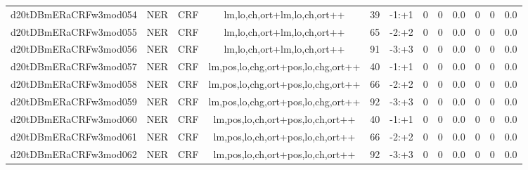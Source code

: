 \documentclass[a4paper]{article}
\begin{document}
\begin{landscape}
\begin{center}
\begin{tabular}{ |c|c|c|c|c|c|c|c|c|c|c|c|}
 
 	
 	\small{ d20tDBmERaCRFw3mod054 } & \small{ NER} & \small{  CRF }  & lm,lo,ch,ort+lm,lo,ch,ort++  &  39 &  \small{  -1:+1 }  &  0 & 0 & 0.0  &  0 & 0 & 0.0 \\
 	

 
 	
 	\small{ d20tDBmERaCRFw3mod055 } & \small{ NER} & \small{  CRF }  & lm,lo,ch,ort+lm,lo,ch,ort++  &  65 &  \small{  -2:+2 }  &  0 & 0 & 0.0  &  0 & 0 & 0.0 \\
 	

 
 	
 	\small{ d20tDBmERaCRFw3mod056 } & \small{ NER} & \small{  CRF }  & lm,lo,ch,ort+lm,lo,ch,ort++  &  91 &  \small{  -3:+3 }  &  0 & 0 & 0.0  &  0 & 0 & 0.0 \\
 	

 
 	
 	\small{ d20tDBmERaCRFw3mod057 } & \small{ NER} & \small{  CRF }  & lm,pos,lo,chg,ort+pos,lo,chg,ort++  &  40 &  \small{  -1:+1 }  &  0 & 0 & 0.0  &  0 & 0 & 0.0 \\
 	

 
 	
 	\small{ d20tDBmERaCRFw3mod058 } & \small{ NER} & \small{  CRF }  & lm,pos,lo,chg,ort+pos,lo,chg,ort++  &  66 &  \small{  -2:+2 }  &  0 & 0 & 0.0  &  0 & 0 & 0.0 \\
 	

 
 	
 	\small{ d20tDBmERaCRFw3mod059 } & \small{ NER} & \small{  CRF }  & lm,pos,lo,chg,ort+pos,lo,chg,ort++  &  92 &  \small{  -3:+3 }  &  0 & 0 & 0.0  &  0 & 0 & 0.0 \\
 	

 
 	
 	\small{ d20tDBmERaCRFw3mod060 } & \small{ NER} & \small{  CRF }  & lm,pos,lo,ch,ort+pos,lo,ch,ort++  &  40 &  \small{  -1:+1 }  &  0 & 0 & 0.0  &  0 & 0 & 0.0 \\
 	

 
 	
 	\small{ d20tDBmERaCRFw3mod061 } & \small{ NER} & \small{  CRF }  & lm,pos,lo,ch,ort+pos,lo,ch,ort++  &  66 &  \small{  -2:+2 }  &  0 & 0 & 0.0  &  0 & 0 & 0.0 \\
 	

 
 	
 	\small{ d20tDBmERaCRFw3mod062 } & \small{ NER} & \small{  CRF }  & lm,pos,lo,ch,ort+pos,lo,ch,ort++  &  92 &  \small{  -3:+3 }  &  0 & 0 & 0.0  &  0 & 0 & 0.0 \\
 	


\end{tabular}
\end{center}
\end{landscape}
\end{document}
